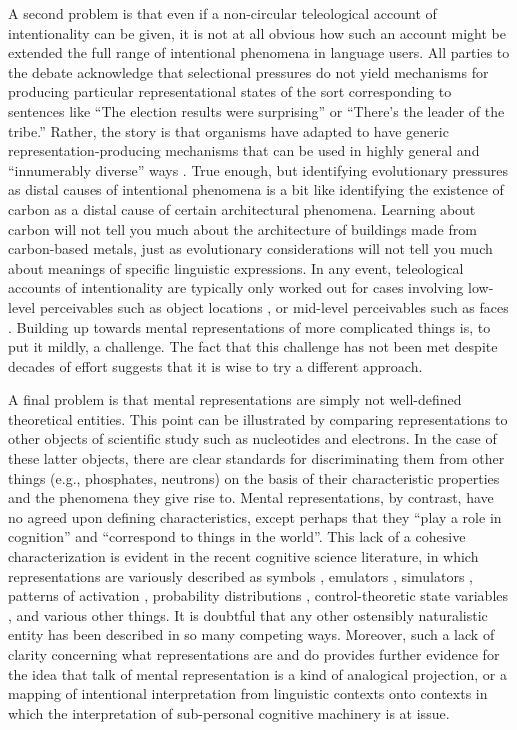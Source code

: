 A second problem is that even if a non-circular teleological account of intentionality can be given, it is not at all obvious how such an account might be extended the full range of intentional phenomena in language users. All parties to the debate acknowledge that selectional pressures do not yield mechanisms for producing particular representational states of the sort corresponding to sentences like ``The election results were surprising'' or ``There's the leader of the tribe.'' Rather, the story is that organisms have adapted to have generic representation-producing mechanisms that can be used in highly general and ``innumerably diverse'' ways \citep[][p. 292]{Millikan:1989}. True enough, but identifying evolutionary pressures as distal causes of intentional phenomena is a bit like identifying the existence of carbon as a distal cause of certain architectural phenomena. Learning about carbon will not tell you much about the architecture of buildings made from carbon-based metals, just as evolutionary considerations will not tell you much about meanings of specific linguistic expressions. In any event, teleological accounts of intentionality are typically only worked out for cases involving low-level perceivables such as object locations \citep{Millikan:1989}, or mid-level perceivables such as faces \citep{Dennett:1987}. Building up towards mental representations of more complicated things is, to put it mildly, a challenge. The fact that this challenge has not been met despite decades of effort suggests that it is wise to try a different approach.

A final problem is that mental representations are simply not well-defined theoretical entities. This point can be illustrated by comparing representations to other objects of scientific study such as nucleotides and electrons. In the case of these latter objects, there are clear standards for discriminating them from other things (e.g., phosphates, neutrons) on the basis of their characteristic properties and the phenomena they give rise to. Mental representations, by contrast, have no agreed upon defining characteristics, except perhaps that they ``play a role in cognition'' and ``correspond to things in the world''. This lack of a cohesive characterization is evident in the recent cognitive science literature, in which representations are variously described as symbols \citep{Fodor:1998}, emulators \citep{Grush:2004}, simulators \citep{Barsalou:1999}, patterns of activation \citep{McClelland:2010}, probability distributions \citep{Goodman:2015} , control-theoretic state variables \citep{Eliasmith:2003,Eliasmith:2013}, and various other things. It is doubtful that any other ostensibly naturalistic entity has been described in so many competing ways. Moreover, such a lack of clarity concerning what representations are and do provides further evidence for the idea that talk of mental representation is a kind of analogical projection, or a mapping of intentional interpretation from linguistic contexts onto contexts in which the interpretation of sub-personal cognitive machinery is at issue.

